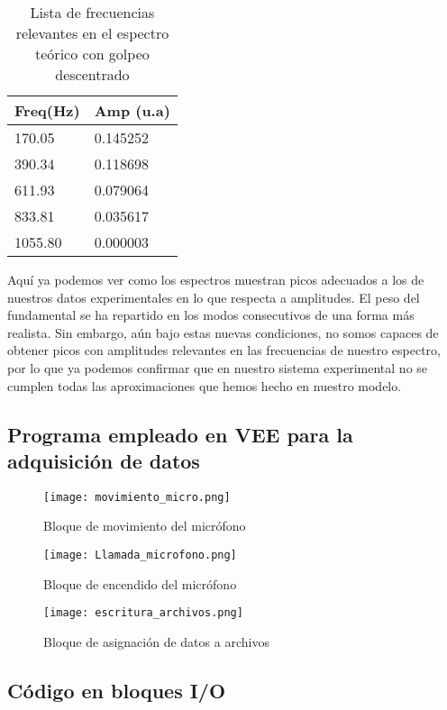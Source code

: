 \documentclass[journal, a4paper,onecolumn]{IEEEtran}
\begin{document}
\begin{table}[H]
\centering
\begin{tabular}{l|l}
Freq(Hz) & Amp (u.a) \\ \hline
170.05   & 0.145252  \\ \hline
390.34   & 0.118698  \\ \hline
611.93   & 0.079064  \\ \hline
833.81   & 0.035617  \\ \hline
1055.80  & 0.000003  \\ 
\end{tabular}
\caption{Lista de frecuencias relevantes en el espectro teórico con golpeo descentrado}
\end{table}

Aquí ya podemos ver como los espectros muestran picos adecuados a los de nuestros datos experimentales en lo que respecta a amplitudes. El peso del fundamental se ha repartido en los modos consecutivos de una forma más realista. Sin embargo, aún bajo estas nuevas condiciones, no somos capaces de obtener picos con amplitudes relevantes en las frecuencias de nuestro espectro, por lo que ya podemos confirmar que en nuestro sistema experimental no se cumplen todas las aproximaciones que hemos hecho en nuestro modelo. \newline

\subsection{Programa empleado en VEE para la adquisición de datos}

\begin{figure}[H]
\centering
    \centering \texttt{[image: movimiento\_micro.png]} 
    \caption{Bloque de movimiento del micrófono}
    \end{figure}
    
    
    \begin{figure}[H]
    \centering
   \texttt{[image: Llamada\_microfono.png]}
    \caption{Bloque de encendido del micrófono}
    \end{figure}
    
    \begin{figure}[H]
    \centering
  \texttt{[image: escritura\_archivos.png]}
   \caption{Bloque de asignación de datos a archivos}
    \label{respuesta_barrido}
  \end{figure} 
  
  \subsection{Código en bloques I/O}
  
\end{document}
